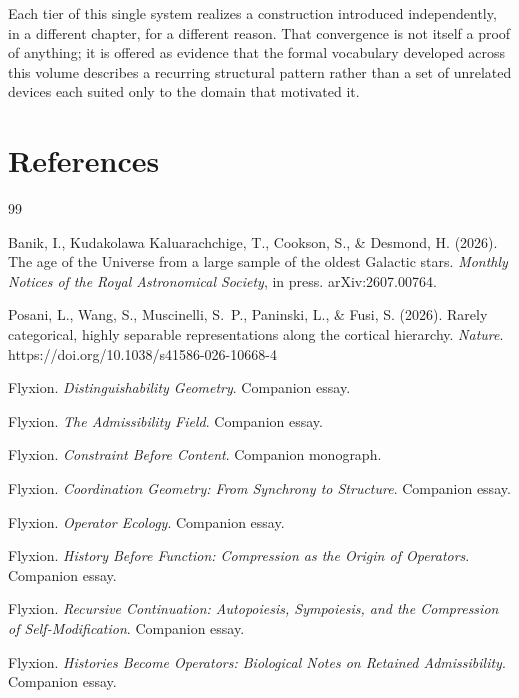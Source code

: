 \documentclass[12pt]{report}
\begin{document}
Each tier of this single system realizes a construction introduced
independently, in a different chapter, for a different reason. That
convergence is not itself a proof of anything; it is offered as evidence
that the formal vocabulary developed across this volume describes a
recurring structural pattern rather than a set of unrelated devices each
suited only to the domain that motivated it.

\chapter*{References}

\begin{thebibliography}{99}

Banik, I., Kudakolawa Kaluarachchige, T., Cookson, S., \& Desmond, H.
(2026). The age of the Universe from a large sample of the oldest
Galactic stars. \textit{Monthly Notices of the Royal Astronomical
Society}, in press. arXiv:2607.00764.

Posani, L., Wang, S., Muscinelli, S.\ P., Paninski, L., \& Fusi, S.
(2026). Rarely categorical, highly separable representations along the
cortical hierarchy. \textit{Nature}. https://doi.org/10.1038/s41586-026-10668-4

Flyxion. \textit{Distinguishability Geometry}. Companion essay.

Flyxion. \textit{The Admissibility Field}. Companion essay.

Flyxion. \textit{Constraint Before Content}. Companion monograph.

Flyxion. \textit{Coordination Geometry: From Synchrony to Structure}.
Companion essay.

Flyxion. \textit{Operator Ecology}. Companion essay.

Flyxion. \textit{History Before Function: Compression as the Origin of
Operators}. Companion essay.

Flyxion. \textit{Recursive Continuation: Autopoiesis, Sympoiesis, and
the Compression of Self-Modification}. Companion essay.

Flyxion. \textit{Histories Become Operators: Biological Notes on
Retained Admissibility}. Companion essay.


\end{thebibliography}
\end{document}
